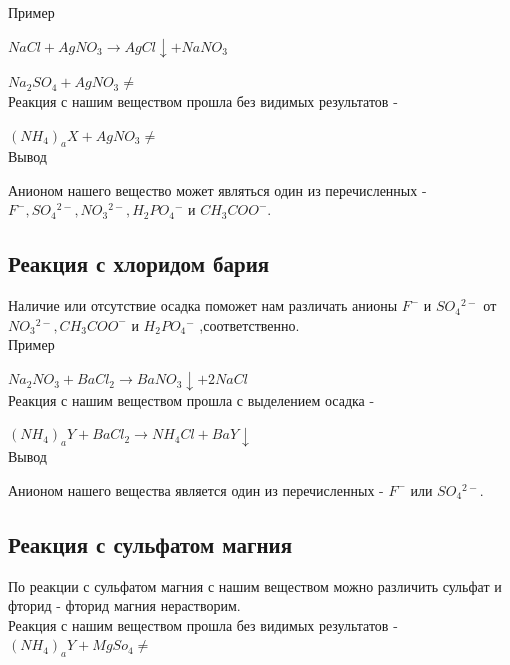 \documentclass[a4paper,14pt,titlepage,twoside]{article}
\begin{document}
            Пример

            $NaCl + AgNO_3 \to AgCl\downarrow + NaNO_3$
            \par$ Na_2SO_4 + AgNO_3 \ne$\\

            Реакция с нашим веществом прошла без видимых результатов -
            \par$(NH_4)_aX + AgNO_3 \ne$\\


            Вывод

            Анионом нашего вещество может являться один из перечисленных -
            $F^-, SO_4{}^{2-}, NO_3{}^{2-}, H_2PO_4{}^-$ и $CH_3COO^-$.

        \newpage
        \subsection{Реакция с хлоридом бария}
            Наличие или отсутствие осадка поможет нам различать анионы\newline
            $F^-$ и $SO_4{}^{2-}$ от $NO_3{}^{2-}, CH_3COO^-$ и $H_2PO_4{}^-$
            ,соответственно.\\

            Пример
            \par$Na_2NO_3 + BaCl_2 \to BaNO_3\downarrow + 2NaCl$\\

            Реакция с нашим веществом прошла с выделением осадка -

            $(NH_4)_aY + BaCl_2 \to NH_4Cl + BaY\downarrow$\\

            Вывод

            Анионом нашего вещества является один из перечисленных - \newline
            $F^-$ или $SO_4{}^{2-}$.

        \subsection{Реакция с сульфатом магния}
             По реакции с сульфатом магния с нашим веществом можно различить сульфат
             и фторид - фторид магния нерастворим.\\

             Реакция с нашим веществом прошла без видимых результатов - \newline
             $(NH_4)_aY + MgSo_4 \ne$
\end{document}
